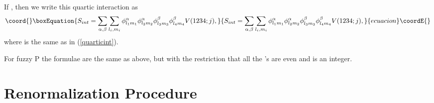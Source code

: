 \documentclass[a4paper,12pt]{article}
\numberwithin{equation}{section}
\begin{document}
If \coordHE{},
then we write this quartic interaction as
\begin{equation}\coord{}\boxEquation{
S_{int} =  \sum_{\alpha,\beta} \sum_{l_i,m_i}\phi^\alpha_{l_1
m_1}\phi^\alpha_{l_2 m_2}\phi^\beta_{l_3 m_3}\phi^\beta_{l_4 m_4}
V(1234;j),  
}{
S_{int} =  \sum_{\alpha,\beta} \sum_{l_i,m_i}\phi^\alpha_{l_1
m_1}\phi^\alpha_{l_2 m_2}\phi^\beta_{l_3 m_3}\phi^\beta_{l_4 m_4}
V(1234;j),  
}{ecuacion}\coordE{}\end{equation} 
where \coordHE{} is the same as in (\ref{quarticint}).

For fuzzy \coordHE{}P\coordHE{} the formulae are the same as above, but
with the restriction that all the \coordHE{}'s are even and \coordHE{} is an
integer.

\section{Renormalization Procedure}
\end{document}
